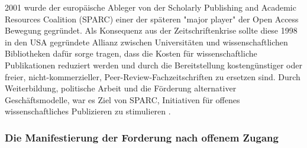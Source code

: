 2001 wurde der europäische Ableger von der Scholarly Publishing and Academic Resources Coalition (SPARC) einer der späteren "major player" der Open Access Bewegung \cite{russell2008business} \cite{Herb_2012} gegründet. Als Konsequenz aus der Zeitschriftenkrise sollte diese 1998 in den USA gegründete Allianz zwischen Universitäten und wissenschaftlichen Bibliotheken dafür sorge tragen, dass die Kosten für wissenschaftliche Publikationen reduziert werden und durch die Bereitstellung kostengünstiger oder freier, nicht-kommerzieller, Peer-Review-Fachzeitschriften zu ersetzen sind. Durch Weiterbildung, politische Arbeit und die Förderung alternativer Geschäftsmodelle, war es Ziel von SPARC, Initiativen für offenes wissenschaftliches Publizieren zu stimulieren \cite{suchen}.

\subsubsection{Die Manifestierung der Forderung nach offenem Zugang}

